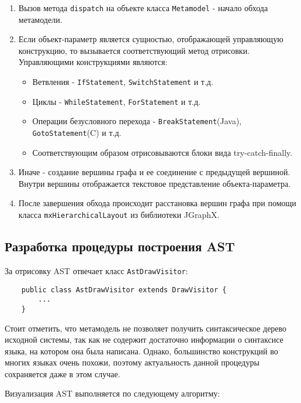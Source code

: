 \begin{enumerate}
    \item Вызов метода \texttt{dispatch} на объекте класса \texttt{Metamodel} -
    начало обхода метамодели.
    \item Если объект-параметр является сущностью, отображающей управляющую
    конструкцию, то вызывается соответствующий метод отрисовки. Управляющими
    конструкциями являются:
        \begin{itemize}
            \item Ветвления - \texttt{IfStatement}, \texttt{SwitchStatement} и т.д.
            \item Циклы - \texttt{WhileStatement}, \texttt{ForStatement} и т.д.
            \item Операции безусловного перехода - \texttt{BreakStatement}(Java),
            \texttt{GotoStatement}(C) и т.д.
            \item Соответствующим образом отрисовываются блоки вида try-catch-finally.
        \end{itemize}
    \item Иначе - создание вершины графа и ее соединение с предыдущей вершиной.
    Внутри вершины отображается текстовое представление объекта-параметра.
    \item После завершения обхода происходит расстановка вершин графа при помощи
    класса \texttt{mxHierarchicalLayout} из библиотеки JGraphX.
\end{enumerate}

\subsection{Разработка процедуры построения AST}

За отрисовку AST отвечает класс \texttt{AstDrawVisitor}:

\begin{lstlisting}
    public class AstDrawVisitor extends DrawVisitor {
        ...
    }
\end{lstlisting}

Стоит отметить, что метамодель не позволяет получить синтаксическое дерево
исходной системы, так как не содержит достаточно информации о синтаксисе языка,
на котором она была написана. Однако, большинство конструкций во многих языках
очень похожи, поэтому актуальность данной процедуры сохраняется даже в этом
случае.

Визуализация AST выполняется по следующему алгоритму:

